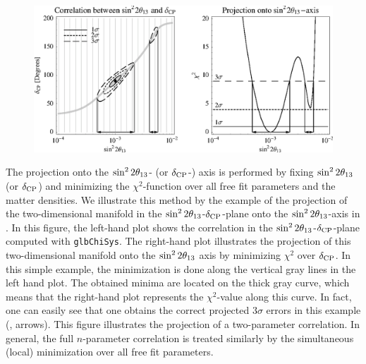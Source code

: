 \begin{figure}[t]
\begin{center}
\includegraphics[width=16cm]{projex}
\end{center}
\end{figure}

The projection onto the $\sin^2 2 \theta_{13}$- (or $\delta_{\mathrm{CP}}$-) axis is performed by fixing $\sin^2 2 \theta_{13}$ (or $\delta_{\mathrm{CP}}$) and minimizing the $\chi^2$-function over all free fit parameters and the matter densities. We illustrate this method by the example of the projection of the two-dimensional manifold in the $\sin^2 2 \theta_{13}$-$\delta_{\mathrm{CP}}$-plane onto the $\sin^2 2 \theta_{13}$-axis in . In this figure, the left-hand plot shows the correlation in the $\sin^2 2 \theta_{13}$-$\delta_{\mathrm{CP}}$-plane computed with {\tt glbChiSys}. The right-hand plot illustrates the projection of this two-dimensional manifold onto the $\sin^2 2 \theta_{13}$ axis by minimizing $\chi^2$ over $\delta_{\mathrm{CP}}$. In this simple example, the minimization is done along the vertical gray lines in the left hand plot. The obtained minima are located on the thick gray curve, which means that the right-hand plot represents the $\chi^2$-value along this curve. In fact, one can easily see that one obtains the correct projected $3 \sigma$ errors in this example (\cf, arrows). This figure illustrates the projection of a two-parameter correlation. In general, the full $n$-parameter correlation is treated similarly by the simultaneous (local) minimization over all free fit parameters. 

